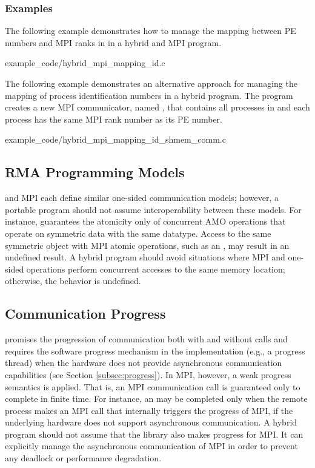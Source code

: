 \subsubsection*{Examples}
\label{subsubsec:interoperability:id:example}
The following example demonstrates how to manage the mapping between \openshmem
\ac{PE} numbers and \ac{MPI} ranks in  in a hybrid \openshmem
and \ac{MPI} program.


      {example_code/hybrid_mpi_mapping_id.c}

The following example demonstrates an alternative approach for managing the mapping
of process identification numbers in a hybrid program. The program creates a
new MPI communicator, named , that contains all
processes in  and each process has the same \ac{MPI} rank
number as its \openshmem \ac{PE} number.


      {example_code/hybrid_mpi_mapping_id_shmem_comm.c}

\subsection{RMA Programming Models}
\label{subsec:interoperability:rma}

\openshmem and \ac{MPI} each define similar one-sided communication models;
however, a portable program should not assume interoperability between these
models.
For instance, \openshmem guarantees the atomicity only of concurrent \openshmem AMO operations
that operate on symmetric data with the same datatype. Access to the same symmetric
object with \ac{MPI} atomic operations, such as an , may
result in an undefined result. A hybrid program should avoid situations where \ac{MPI} and
\openshmem one-sided operations perform concurrent accesses to the same memory
location; otherwise, the behavior is undefined.

\subsection{Communication Progress}
\label{subsec:interoperability:progress}

\openshmem promises the progression of communication both with and without
\openshmem calls and requires the software progress mechanism in the implementation
(e.g., a progress thread) when the hardware does not provide asynchronous communication
capabilities (see Section \ref{subsec:progress}).
In \ac{MPI}, however, a weak progress semantics is applied. That is,
an \ac{MPI} communication call is guaranteed only to complete in finite time. For
instance, an  may be completed only when the remote process makes an \ac{MPI}
call that internally triggers the progress of \ac{MPI}, if the underlying hardware
does not support asynchronous communication. A hybrid program
should not assume that the \openshmem library also makes progress for \ac{MPI}.
It can explicitly manage the asynchronous communication of \ac{MPI} in
order to prevent any deadlock or performance degradation.
